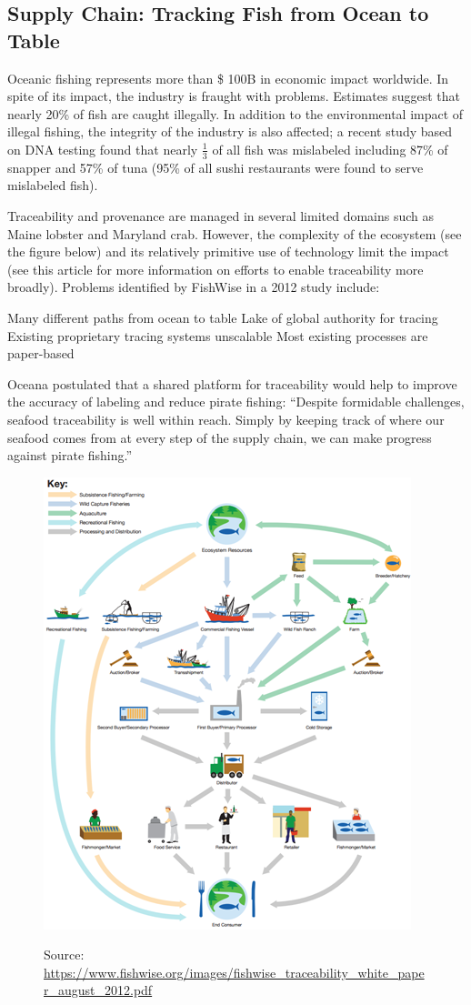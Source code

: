 \subsection{Supply Chain: Tracking Fish from Ocean to Table}

Oceanic fishing represents more than \$ 100B in economic impact worldwide. In spite of its impact,
the industry is fraught with problems. Estimates suggest that nearly 20\% of fish are caught
illegally. In addition to the environmental impact of illegal fishing, the integrity of the industry
is also affected; a recent study based on DNA testing found that nearly $\frac{1}{3}$ of all fish
was mislabeled including 87\% of snapper and 57\% of tuna (95\% of all sushi restaurants were found
to serve mislabeled fish).

Traceability and provenance are managed in several limited domains such as Maine lobster and
Maryland crab. However, the complexity of the ecosystem (see the figure below) and its relatively
primitive use of technology limit the impact (see this article for more information on efforts to
enable traceability more broadly). Problems identified by FishWise in a 2012 study include:

Many different paths from ocean to table Lake of global authority for tracing Existing proprietary
tracing systems unscalable Most existing processes are paper-based

Oceana postulated that a shared platform for traceability would help to improve the accuracy of
labeling and reduce pirate fishing: ``Despite formidable challenges, seafood traceability is well
within reach. Simply by keeping track of where our seafood comes from at every step of the supply
chain, we can make progress against pirate fishing.''

\begin{figure}
   \includegraphics[scale=1.0]{figures/FishSupplyChain.png} \
   \caption{Source: \url{https://www.fishwise.org/images/fishwise_traceability_white_paper_august_2012.pdf}}
  \label{fig:supplychain}
\end{figure}

